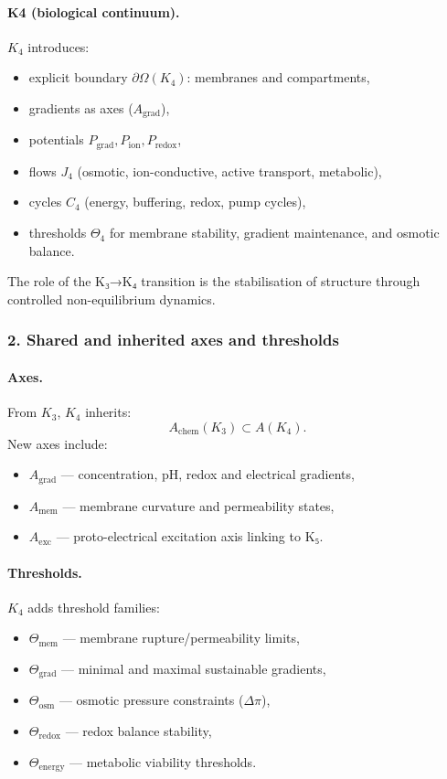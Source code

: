 \paragraph{K4 (biological continuum).}
$K_4$ introduces:
\begin{itemize}
  \item explicit boundary $\partial\Omega(K_4)$: membranes and compartments,
  \item gradients as axes ($A_{\mathrm{grad}}$),
  \item potentials $P_{\mathrm{grad}}, P_{\mathrm{ion}}, P_{\mathrm{redox}}$,
  \item flows $J_4$ (osmotic, ion-conductive, active transport, metabolic),
  \item cycles $C_4$ (energy, buffering, redox, pump cycles),
  \item thresholds $\Theta_4$ for membrane stability, gradient maintenance,
        and osmotic balance.
\end{itemize}

The role of the K₃→K₄ transition is the stabilisation of structure through
controlled non-equilibrium dynamics.

\subsubsection{2. Shared and inherited axes and thresholds}

\paragraph{Axes.}
From $K_3$, $K_4$ inherits:
\[
A_{\mathrm{chem}}(K_3) \subset A(K_4).
\]
New axes include:
\begin{itemize}
  \item $A_{\mathrm{grad}}$ — concentration, pH, redox and electrical
        gradients,
  \item $A_{\mathrm{mem}}$ — membrane curvature and permeability states,
  \item $A_{\mathrm{exc}}$ — proto-electrical excitation axis linking to K₅.
\end{itemize}

\paragraph{Thresholds.}
$K_4$ adds threshold families:
\begin{itemize}
  \item $\Theta_{\mathrm{mem}}$ — membrane rupture/permeability limits,
  \item $\Theta_{\mathrm{grad}}$ — minimal and maximal sustainable gradients,
  \item $\Theta_{\mathrm{osm}}$ — osmotic pressure constraints ($\Delta\pi$),
  \item $\Theta_{\mathrm{redox}}$ — redox balance stability,
  \item $\Theta_{\mathrm{energy}}$ — metabolic viability thresholds.
\end{itemize}

